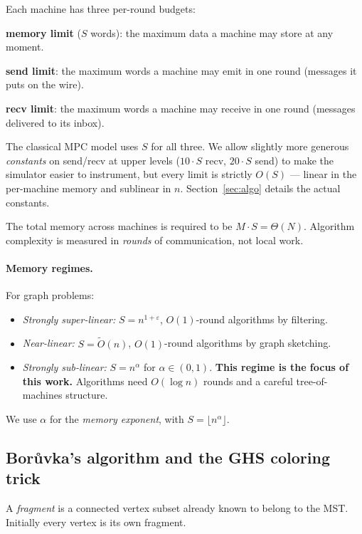 \documentclass[11pt]{article}
\begin{document}
Each machine has three per-round budgets:

\smallskip
\noindent
\textbf{memory limit} ($S$ words): the maximum data a machine may store at any
moment.

\smallskip
\noindent
\textbf{send limit}: the maximum words a machine may emit in one round
(messages it puts on the wire).

\smallskip
\noindent
\textbf{recv limit}: the maximum words a machine may receive in one round
(messages delivered to its inbox).

\smallskip
The classical MPC model uses $S$ for all three. We allow slightly more
generous \textit{constants} on send/recv at upper levels ($10 \cdot S$ recv,
$20 \cdot S$ send) to make the simulator easier to instrument, but every
limit is strictly $O(S)$ --- linear in the per-machine memory and sublinear
in $n$. Section~\ref{sec:algo} details the actual constants.

The total memory across machines is required to be $M \cdot S = \Theta(N)$.
Algorithm complexity is measured in \textit{rounds} of communication, not
local work.

\paragraph{Memory regimes.} For graph problems:
\begin{itemize}[topsep=2pt, itemsep=2pt, leftmargin=*]
    \item \textit{Strongly super-linear:} $S = n^{1+\varepsilon}$, $O(1)$-round
          algorithms by filtering.
    \item \textit{Near-linear:} $S = \tilde{O}(n)$, $O(1)$-round algorithms
          by graph sketching.
    \item \textit{Strongly sub-linear:} $S = n^{\alpha}$ for
          $\alpha \in (0,1)$. \textbf{This regime is the focus of this work.}
          Algorithms need $O(\log n)$ rounds and a careful tree-of-machines
          structure.
\end{itemize}
We use $\alpha$ for the \textit{memory exponent}, with
$S = \lfloor n^{\alpha} \rfloor$.

\subsection{Bor\r{u}vka's algorithm and the GHS coloring trick}

A \textit{fragment} is a connected vertex subset already known to belong to
the MST. Initially every vertex is its own fragment.
\end{document}

